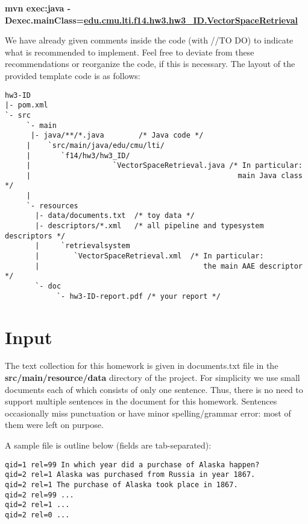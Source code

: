 \documentclass[oneside,11pt]{memoir}
\begin{document}
\begin{center}\small\textbf{mvn exec:java 
       -Dexec.mainClass=\url{edu.cmu.lti.f14.hw3.hw3_ID.VectorSpaceRetrieval}}\end{center}

We have already given comments inside the code (with //TO DO) to indicate what is recommended
to implement. Feel free to deviate from these recommendations
 or reorganize the code, if this is necessary.
The layout of the provided template code is as follows:

\vspace{2em}
\hspace{-3em}
\begin{minipage}{0.9\textwidth}
\footnotesize
\begin{verbatim}
hw3-ID
|- pom.xml
`- src
     `- main
      |- java/**/*.java        /* Java code */
     |    `src/main/java/edu/cmu/lti/
     |       `f14/hw3/hw3_ID/
     |                   `VectorSpaceRetrieval.java /* In particular:
     |                                                main Java class */
     |                           
     `- resources
       |- data/documents.txt  /* toy data */ 
       |- descriptors/*.xml   /* all pipeline and typesystem descriptors */
       |     `retrievalsystem
       |        `VectorSpaceRetrieval.xml  /* In particular: 
       |                                      the main AAE descriptor */
       `- doc
            `- hw3-ID-report.pdf /* your report */

\end{verbatim}
\normalsize
\end{minipage}



\section{Input}
The text collection for this homework is given in documents.txt file in 
the \textbf{src/main/resource/data} directory of the project. 
For simplicity we use small documents each of which consists of only one sentence.
Thus, there is no need to support multiple sentences in the document for this
homework.
Sentences occasionally miss punctuation or have minor spelling/grammar error:
most of them were left on purpose.

A sample file is outline below (fields are tab-separated):

\begin{verbatim}
qid=1 rel=99 In which year did a purchase of Alaska happen?
qid=2 rel=1 Alaska was purchased from Russia in year 1867.
qid=2 rel=1 The purchase of Alaska took place in 1867.
qid=2 rel=99 ...
qid=2 rel=1 ...
qid=2 rel=0 ...
\end{verbatim}
\end{document}
